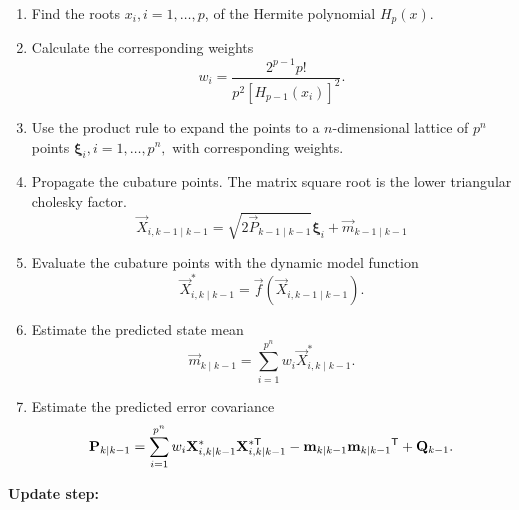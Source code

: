 \begin{enumerate}

  \item Find the roots $x_i, i=1,\ldots,p$, of the Hermite polynomial $H_p(x)$.%

  \item Calculate the corresponding weights%
%
   $$ w_i = \frac{2^{p-1}p!}{p^2[H_{p-1}(x_i)]^2}. $$

  \item Use the product rule to expand the points to a $n$-dimensional lattice of $p^n$ points $\boldsymbol{\xi}_i, i=1,\ldots,p^n,$ with corresponding weights. 

  \item Propagate the cubature points. The matrix square root is the lower triangular cholesky factor.%
%
    $$ \vec{X}_{i,k-1 \mid k-1} = \sqrt{2 \vec{P}_{k-1 \mid k-1}} \boldsymbol{\xi}_i + \vec{m}_{k-1 \mid k-1}$$

  \item Evaluate the cubature points with the dynamic model function%
%
    $$ \vec{X}_{i,k \mid k-1}^* = \vec{f}(\vec{X}_{i,k-1 \mid k-1}). $$

  \item Estimate the predicted state mean%
%
    $$ \vec{m}_{k \mid k-1}  = \sum_{i=1}^{p^n} w_i \vec{X}_{i,k \mid k-1}^*. $$

  \item Estimate the predicted error covariance%
%
    $$ \mathbf{P}_{k \mid k-1} = \sum_{i=1}^{p^n} w_i \mathbf{X}_{i,k \mid k-1}^* \mathbf{X}_{i,k \mid k-1}^{*\mathsf{T}} - \mathbf{m}_{k \mid k-1} \mathbf{m}_{k \mid k-1}\mathsf{^T} + \mathbf{Q}_{k-1}.$$ 

\end{enumerate}


\noindent
\textbf{Update step:}

